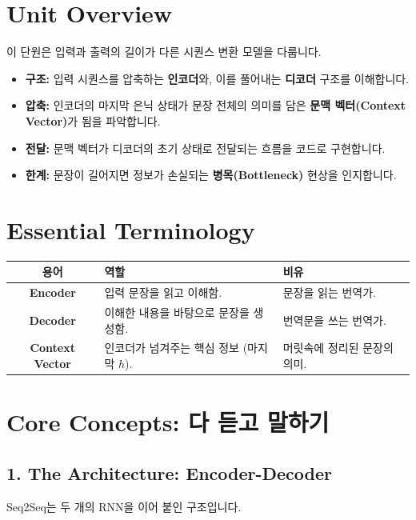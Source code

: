 \documentclass[11pt,a4paper]{book}
\theoremstyle{definition}
\begin{document}
\section{Unit Overview}
\begin{summarybox}[title={핵심 목표}]
이 단원은 입력과 출력의 길이가 다른 시퀀스 변환 모델을 다룹니다.
\begin{itemize}
    \item \textbf{구조:} 입력 시퀀스를 압축하는 \textbf{인코더}와, 이를 풀어내는 \textbf{디코더} 구조를 이해합니다.
    \item \textbf{압축:} 인코더의 마지막 은닉 상태가 문장 전체의 의미를 담은 \textbf{문맥 벡터(Context Vector)}가 됨을 파악합니다.
    \item \textbf{전달:} 문맥 벡터가 디코더의 초기 상태로 전달되는 흐름을 코드로 구현합니다.
    \item \textbf{한계:} 문장이 길어지면 정보가 손실되는 \textbf{병목(Bottleneck)} 현상을 인지합니다.
\end{itemize}
\end{summarybox}

\section{Essential Terminology}
\begin{center}
\begin{tabular}{|c|l|l|}
\hline
\textbf{용어} & \textbf{역할} & \textbf{비유} \\ \hline
\textbf{Encoder} & 입력 문장을 읽고 이해함. & 문장을 읽는 번역가. \\ \hline
\textbf{Decoder} & 이해한 내용을 바탕으로 문장을 생성함. & 번역문을 쓰는 번역가. \\ \hline
\textbf{Context Vector} & 인코더가 넘겨주는 핵심 정보 (마지막 $h$). & 머릿속에 정리된 문장의 의미. \\ \hline
\end{tabular}
\end{center}

\section{Core Concepts: 다 듣고 말하기}

\subsection{1. The Architecture: Encoder-Decoder}
Seq2Seq는 두 개의 RNN을 이어 붙인 구조입니다.
\end{document}
